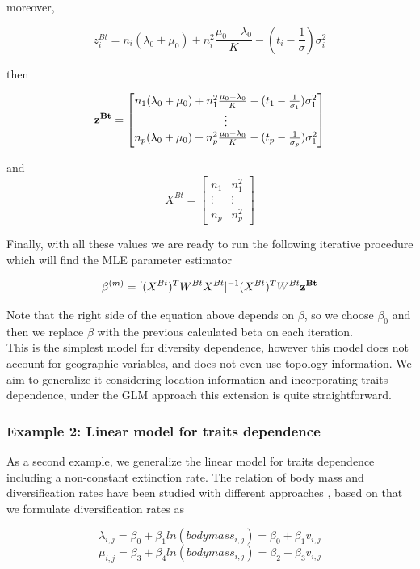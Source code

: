 moreover, 

$$ z_i^{Bt} = n_i(\lambda_0 + \mu_0) + n_i^2\frac{\mu_0-\lambda_0}{K} - (t_i -\frac{1}{\sigma})\sigma_i^2 $$


then 

$$\bf{z}^{Bt} = \begin{bmatrix}
     n_1(\lambda_0 + \mu_0) + n_1^2\frac{\mu_0-\lambda_0}{K} - (t_1 -\frac{1}{\sigma_1})\sigma_1^2 \\
   \vdots \\
  n_p(\lambda_0 + \mu_0) + n_p^2\frac{\mu_0-\lambda_0}{K} - (t_p -\frac{1}{\sigma_p})\sigma_1^2
  \end{bmatrix}
$$

and
$$ 
 X^{Bt}=
  \begin{bmatrix}
    n_1 &   n_1^2 \\
    \vdots & \vdots \\
    n_p & n_p^2
  \end{bmatrix}
$$ 


Finally, with all these values we are ready to run the following iterative procedure which will find the MLE parameter estimator 

$$\beta^{(m)}=[(X^{Bt})^TW^{Bt}X^{Bt}]^{-1}(X^{Bt})^TW^{Bt}\bf{z}^{Bt}$$

Note that the right side of the equation above depends on $\beta$, so we choose $\beta_0$ and then we replace $\beta$ with the previous calculated beta on each iteration. \\

This is the simplest model for diversity dependence, however this model does not account for geographic variables, and does not even use topology information. We aim to generalize it considering location information and incorporating traits dependence, under the GLM approach this extension is quite straightforward.  

 
\subsubsection{Example 2: Linear model for traits dependence}

As a second example, we generalize the linear model for traits dependence \cite{paradis2005statistical} including a non-constant extinction rate. The relation of body mass and diversification rates have been studied with different approaches \cite{gittleman1998body}, based on that we formulate diversification rates as

$$ \lambda_{i,j} = \beta_0 +\beta_1 ln(body mass_{i,j})= \beta_0 + \beta_1 v_{i,j} $$ 
$$ \mu_{i,j} = \beta_3 +\beta_4 ln(body mass_{i,j}) = \beta_2 + \beta_3 v_{i,j}$$

